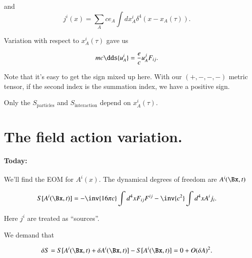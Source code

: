 and
\begin{equation}\label{eqn:relativisticElectrodynamicsL13:70}
j^i(x) = \sum_A c e_A \int dx_A^i \delta^4( x - x_A(\tau)).
\end{equation}

Variation with respect to $x_A^i(\tau)$ gave us

\begin{equation}\label{eqn:relativisticElectrodynamicsL13:90}
m c \dds{u^i_A} = \frac{e}{c} u_A^j F_{ij}.
\end{equation}

Note that it's easy to get the sign mixed up here.  With our $(+,-,-,-)$ metric tensor, if the second index is the summation index, we have a positive sign.

Only the $S_{\text{particles}}$ and $S_{\text{interaction}}$ depend on $x_A^i(\tau)$.

\section{The field action variation.}

\paragraph{Today:} We'll find the EOM for $A^i(x)$.  The dynamical degrees of freedom are $A^i(\Bx,t)$

\begin{equation}\label{eqn:relativisticElectrodynamicsL13:110}
S[A^i(\Bx, t)] = -\inv{16 \pi c} \int d^4x F_{ij}F^{ij} - \inv{c^2} \int d^4 x A^i j_i.
\end{equation}

Here $j^i$ are treated as ``sources''.

We demand that

\begin{equation}\label{eqn:relativisticElectrodynamicsL13:130}
\delta S = S[ A^i(\Bx, t) + \delta A^i(\Bx, t)] - S[ A^i(\Bx, t) ] = 0 + O(\delta A)^2.
\end{equation}

